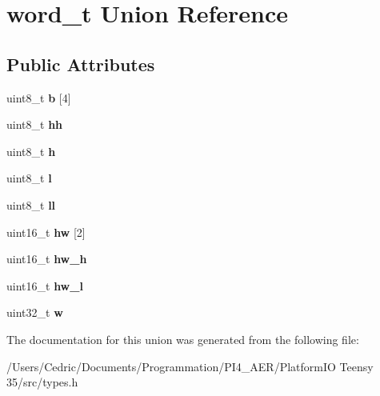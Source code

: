\hypertarget{unionword__t}{}\section{word\+\_\+t Union Reference}
\label{unionword__t}
\subsection*{Public Attributes}
\begin{DoxyCompactItemize}
\item 
\mbox{\label{unionword__t_a241833e884f89993c35b049348a53bd9}} 
uint8\+\_\+t {\bfseries b} \mbox{[}4\mbox{]}
\item 
\mbox{\label{unionword__t_a108eb4b1e1d8fb1373248b72a4596711}} 
uint8\+\_\+t {\bfseries hh}
\item 
\mbox{\label{unionword__t_a5c40322ceb3ebc3a507f280a23b64125}} 
uint8\+\_\+t {\bfseries h}
\item 
\mbox{\label{unionword__t_a0e551136f3180decf3efad3c3ffcf248}} 
uint8\+\_\+t {\bfseries l}
\item 
\mbox{\label{unionword__t_a47aa643a9fae4c038bc7090541a17bdd}} 
uint8\+\_\+t {\bfseries ll}
\item 
\mbox{\label{unionword__t_a74023b037926dc260fc665f2e3003514}} 
uint16\+\_\+t {\bfseries hw} \mbox{[}2\mbox{]}
\item 
\mbox{\label{unionword__t_a917e306cd90ad579a97621f275a308b6}} 
uint16\+\_\+t {\bfseries hw\+\_\+h}
\item 
\mbox{\label{unionword__t_ad97e3442d4b100e28f18da53995e9812}} 
uint16\+\_\+t {\bfseries hw\+\_\+l}
\item 
\mbox{\label{unionword__t_a72e600d0d0b1f623ee723be8e3aeda7e}} 
uint32\+\_\+t {\bfseries w}
\end{DoxyCompactItemize}


The documentation for this union was generated from the following file\+:\begin{DoxyCompactItemize}
\item 
/\+Users/\+Cedric/\+Documents/\+Programmation/\+P\+I4\+\_\+\+A\+E\+R/\+Platform\+I\+O Teensy 35/src/types.\+h\end{DoxyCompactItemize}
